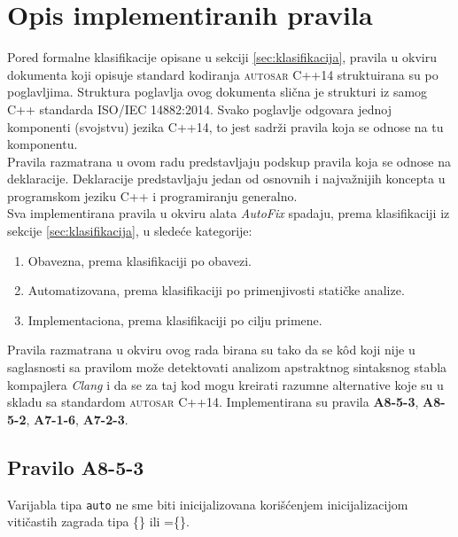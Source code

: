 \documentclass[12pt,oneside]{memoir}
\begin{document}
\section{Opis implementiranih pravila}

Pored formalne klasifikacije opisane u sekciji \ref{sec:klasifikacija}, pravila u okviru dokumenta koji opisuje standard kodiranja \textsc{autosar} C++14 \cite{AutosarGuidelines} struktuirana su po poglavljima.
Struktura poglavlja ovog dokumenta slična je strukturi iz samog C++ standarda ISO/IEC 14882:2014. Svako poglavlje odgovara jednoj komponenti (svojstvu) jezika C++14, to jest sadrži pravila koja se odnose na tu komponentu.
\\
\indent
Pravila razmatrana u ovom radu predstavljaju podskup pravila koja se odnose na deklaracije. Deklaracije predstavljaju jedan
od osnovnih i najvažnijih koncepta u programskom jeziku C++ i programiranju generalno.
\\
\indent
Sva implementirana pravila u okviru alata \textit{AutoFix} spadaju, prema klasifikaciji iz sekcije \ref{sec:klasifikacija}, u sledeće kategorije:
\begin{enumerate}
  \item{Obavezna, prema klasifikaciji po obavezi.}
  \item{Automatizovana, prema klasifikaciji po primenjivosti statičke analize.}
  \item{Implementaciona, prema klasifikaciji po cilju primene.}
\end{enumerate}
Pravila razmatrana u okviru ovog rada birana su tako da se k\^{o}d koji nije u saglasnosti sa pravilom mo\v{z}e detektovati analizom apstraktnog sintaksnog stabla kompajlera \textit{Clang} i da se za taj kod mogu kreirati razumne alternative koje su u skladu sa standardom \textsc{autosar} C++14.
Implementirana su pravila \textbf{A8-5-3}, \textbf{A8-5-2}, \textbf{A7-1-6}, \textbf{A7-2-3}.

\subsection{Pravilo A8-5-3}
\begin{center}
\begin{tcolorbox}
Varijabla tipa \texttt{auto} ne sme biti inicijalizovana kori\v{s}\'{c}enjem
inicijalizacijom viti\v{c}astih zagrada tipa \{\} ili =\{\}.
\end{tcolorbox}
\end{center}
\end{document}
